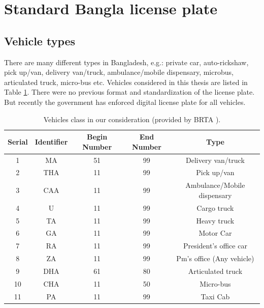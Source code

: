 \section{Standard Bangla license plate}
\subsection{Vehicle types}
There are many different types in Bangladesh, e.g.: private car, auto-rickshaw, pick up/van, delivery van/truck, ambulance/mobile dispensary, microbus, articulated truck, micro-bus etc. Vehicles considered in this thesis are listed in Table \ref{tab:vechicleClasses}. There were no previous format and standardization of the license plate. But recently the government has enforced digital license plate for all vehicles.

  
\begin{table}[htb]
	\centering
	\begin{tabular}{|c|c|c|c|c|}
		\hline
		Serial & Identifier & Begin Number & End Number & Type \\
		\hline
		1  & MA  & 51 & 99 & Delivery van/truck \\ 
		\hline
		2  & THA & 11 & 99 & Pick up/van \\ 
		\hline
		3  & CAA & 11 & 99 & Ambulance/Mobile dispensary \\ 
		\hline
		4  & U	 & 11 & 99 &	Cargo truck \\ 
		\hline
		5  & TA	 & 11 & 99 & Heavy truck \\ 
		\hline
		6  & GA  & 11 & 99 & Motor Car \\ 
		\hline
		7  & RA	 & 11 & 99 & President's office car \\ 
		\hline
		8  & ZA	 & 11 & 99 & Pm’s office (Any vehicle) \\ 
		\hline
		9  & DHA & 61 & 80 & Articulated truck \\
		\hline
		10 & CHA & 11 & 50 & Micro-bus \\ 
		\hline
		11 & PA	 & 11 & 99 & Taxi Cab \\ 
		\hline		
	\end{tabular}
	\caption{Vehicles class in our consideration (provided by BRTA \cite{brta}).}
	\label{tab:vechicleClasses}
\end{table}

